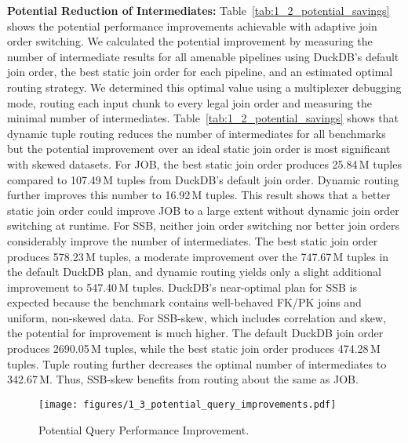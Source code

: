 \textbf{Potential Reduction of Intermediates:} Table~\ref{tab:1_2_potential_savings} shows the potential performance improvements achievable with adaptive join order switching. We calculated the potential improvement by measuring the number of intermediate results for all amenable pipelines using DuckDB's default join order, the best static join order for each pipeline, and an estimated optimal routing strategy. We determined this optimal value using a multiplexer debugging mode, routing each input chunk to every legal join order and measuring the minimal number of intermediates.
%
Table~\ref{tab:1_2_potential_savings} shows that dynamic tuple routing reduces the number of intermediates for all benchmarks but the potential improvement over an ideal static join order is most significant with skewed datasets. For JOB, the best static join order produces 25.84\,M tuples compared to 107.49\,M tuples from DuckDB's default join order. Dynamic routing further improves this number to 16.92\,M tuples. This result shows that a better static join order could improve JOB to a large extent without dynamic join order switching at runtime. For SSB, neither join order switching nor better join orders considerably improve the number of intermediates. The best static join order produces 578.23\,M tuples, a moderate improvement over the 747.67\,M tuples in the default DuckDB plan, and dynamic routing yields only a slight additional improvement to 547.40\,M tuples. DuckDB's near-optimal plan for SSB is expected because the benchmark contains well-behaved FK/PK joins and uniform, non-skewed data.
%
For SSB-skew, which includes correlation and skew, the potential for improvement is much higher. The default DuckDB join order produces 2690.05\,M tuples, while the best static join order produces 474.28\,M tuples. Tuple routing further decreases the optimal number of intermediates to 342.67\,M. Thus, SSB-skew benefits from routing about the same as JOB.

\begin{figure}[!t]
    \centering
    \texttt{[image: figures/1\_3\_potential\_query\_improvements.pdf]}
    \vspace{-0.4cm}
		\caption{Potential Query Performance Improvement.}
    \label{fig:1_3_potential_query_improvements}
		\vspace{-0.5cm}
\end{figure}

